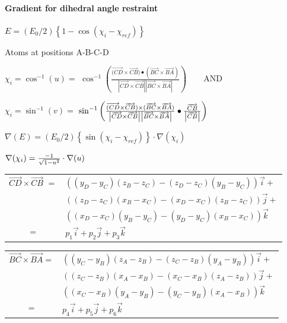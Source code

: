 \paragraph*{Gradient for dihedral angle restraint}

$E=(E_{0}/2)\left\{ 1-\cos \left( \chi _{i}-\chi _{ref}\right) \right\} $

Atoms at positions A-B-C-D

$\chi _{i}=\cos ^{-1}(u)=$ $\cos ^{-1}\left( \frac{\overrightarrow{(CD}%
\times \overrightarrow{CB})\bullet (\overrightarrow{BC}\times 
\overrightarrow{BA})}{\left| \overrightarrow{CD}\times \overrightarrow{CB}%
\right| \left| \overrightarrow{BC}\times \overrightarrow{BA}\right| }\right)
\qquad $AND

$\chi _{i}=\sin ^{-1}(v)=$ $\sin ^{-1}\left( \frac{\overrightarrow{(CD}%
\times \overrightarrow{CB})\times (\overrightarrow{BC}\times \overrightarrow{%
BA})}{\left| \overrightarrow{CD}\times \overrightarrow{CB}\right| \left| 
\overrightarrow{BC}\times \overrightarrow{BA}\right| }\bullet \frac{%
\overrightarrow{CB}}{\left| \overrightarrow{CB}\right| }\right) $

$\nabla (E)=(E_{0}/2)\left\{ \sin \left( \chi _{i}-\chi _{ref}\right)
\right\} \cdot \nabla (\chi _{i})$

$\nabla (\chi _{i})=\frac{-1}{\sqrt{1-u^{2}}}\cdot \nabla (u)\smallskip
\medskip $

\begin{tabular}{ll}
$\overrightarrow{CD}\times \overrightarrow{CB}$ $=$ & $%
((y_{D}-y_{C})(z_{B}-z_{C})-(z_{D}-z_{C})(y_{B}-y_{C}))\overrightarrow{i}+$
\\ 
& $((z_{D}-z_{C})(x_{B}-x_{C})-(x_{D}-x_{C})(z_{B}-z_{C}))\overrightarrow{j}+
$ \\ 
& $((x_{D}-x_{C})(y_{B}-y_{C})-(y_{D}-y_{C})(x_{B}-x_{C}))\overrightarrow{k}$
\\ 
\multicolumn{1}{c}{$=$} & $p_{1}\overrightarrow{i}+p_{2}\overrightarrow{j}%
+p_{3}\overrightarrow{k}$%
\end{tabular}
\medskip \medskip 

\begin{tabular}{ll}
$\overrightarrow{BC}\times \overrightarrow{BA}=$ & $%
((y_{C}-y_{B})(z_{A}-z_{B})-(z_{C}-z_{B})(y_{A}-y_{B}))\overrightarrow{i}+$
\\ 
& $((z_{C}-z_{B})(x_{A}-x_{B})-(x_{C}-x_{B})(z_{A}-z_{B}))\overrightarrow{j}+
$ \\ 
& $((x_{C}-x_{B})(y_{A}-y_{B})-(y_{C}-y_{B})(x_{A}-x_{B}))\overrightarrow{k}$
\\ 
\multicolumn{1}{c}{$=$} & $p_{4}\overrightarrow{i}+p_{5}\overrightarrow{j}
+p_{6}\overrightarrow{k}$%
\end{tabular}
\medskip \medskip 

